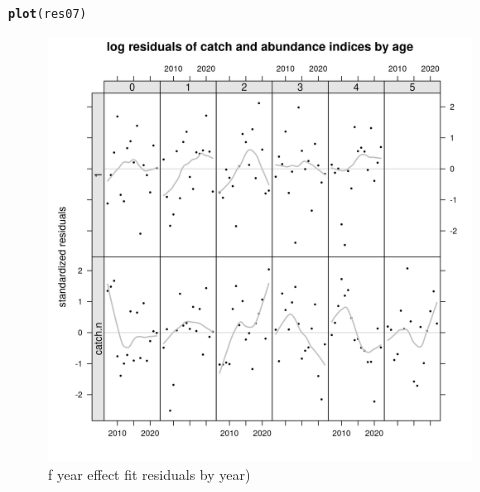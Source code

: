 \documentclass[a4paper,english,11pt]{article}\usepackage[]{graphicx}\usepackage[]{xcolor}
\makeatletter
\newcommand{\hldef}[1]{\textcolor[rgb]{0.345,0.345,0.345}{#1}}%
\newcommand{\hlkwd}[1]{\textcolor[rgb]{0.737,0.353,0.396}{\textbf{#1}}}%
\newenvironment{kframe}{%
 \def\at@end@of@kframe{}%
 \ifinner\ifhmode%
  \def\at@end@of@kframe{\end{minipage}}%
  \begin{minipage}{\columnwidth}%
 \fi\fi%
 \def\FrameCommand##1{\hskip\@totalleftmargin \hskip-\fboxsep
 \colorbox{shadecolor}{##1}\hskip-\fboxsep
     \hskip-\linewidth \hskip-\@totalleftmargin \hskip\columnwidth}%
 \MakeFramed {\advance\hsize-\width
   \@totalleftmargin\z@ \linewidth\hsize
   \@setminipage}}%
 {\par\unskip\endMakeFramed%
 \at@end@of@kframe}
\newenvironment{knitrout}{}{} %
\makeatother
\begin{document}
\begin{knitrout}
\color{fgcolor}\begin{kframe}
\begin{alltt}
\hlkwd{plot}\hldef{(res07)}
\end{alltt}
\end{kframe}\begin{figure}[H]

{\centering \includegraphics[width=.9\linewidth]{figure/srresbyyear-1} 

}

\caption[f year effect fit residuals by year)]{f year effect fit residuals by year)}\label{fig:srresbyyear}
\end{figure}

\end{knitrout}
\end{document}
